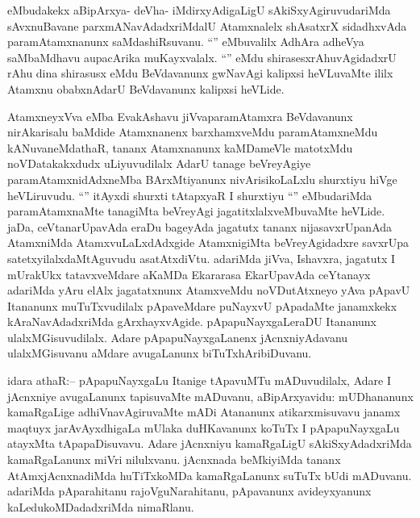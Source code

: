 \begin{artha}
eMbudakekx aBipArxya- deVha- iMdirxyAdigaLigU sAkiSxyAgiruvudariMda sAvxnuBavane parxmANavAdadxriMdalU Atamxnalelx shAsatxrX sidadhxvAda paramAtamxnanunx saMdashiRsuvanu. ``\stext'' eMbuvalilx AdhAra adheVya saMbaMdhavu aupacArika muKayxvalalx. ``\stext'' eMdu shirasesxrAhuvAgidadxrU rAhu dina shirasusx eMdu BeVdavanunx gwNavAgi kalipxsi heVLuvaMte ililx Atamxnu obabxnAdarU BeVdavanunx kalipxsi heVLide.
\end{artha}

\begin{artha}
AtamxneyxVva eMba EvakAshavu jiVvaparamAtamxra BeVdavanunx nirAkarisalu baMdide Atamxnanenx barxhamxveMdu paramAtamxneMdu kANuvaneMdathaR, tananx Atamxnanunx kaMDameVle matotxMdu noVDatakakxdudx uLiyuvudilalx AdarU tanage beVreyAgiye paramAtamxnidAdxneMba BArxMtiyanunx nivArisikoLaLxlu shurxtiyu hiVge heVLiruvudu. ``\stext'' itAyxdi shurxti tAtapxyaR I shurxtiyu ``\stext'' eMbudariMda paramAtamxnaMte tanagiMta beVreyAgi jagatitxlalxveMbuvaMte heVLide. jaDa, ceVtanarUpavAda eraDu bageyAda jagatutx tananx nijasavxrUpanAda AtamxniMda AtamxvuLaLxdAdxgide AtamxnigiMta beVreyAgidadxre savxrUpa satetxyilalxdaMtAguvudu asatAtxdiVtu. adariMda jiVva, Ishavxra, jagatutx I mUrakUkx tatavxveMdare aKaMDa Ekararasa EkarUpavAda ceYtanayx adariMda yAru elAlx jagatatxnunx AtamxveMdu noVDutAtxneyo yAva pApavU Itananunx muTuTxvudilalx pApaveMdare puNayxvU pApadaMte janamxkekx kAraNavAdadxriMda gArxhayxvAgide. pApapuNayxgaLeraDU Itananunx ulalxMGisuvudilalx. Adare pApapuNayxgaLanenx jAcnxniyAdavanu ulalxMGisuvanu aMdare avugaLanunx biTuTxhAribiDuvanu. 
\end{artha}

\begin{artha}
idara athaR:-- pApapuNayxgaLu Itanige tApavuMTu mADuvudilalx, Adare I jAcnxniye avugaLanunx tapisuvaMte mADuvanu, aBipArxyavidu: mUDhananunx kamaRgaLige adhiVnavAgiruvaMte mADi Atananunx atikarxmisuvavu janamx maqtuyx jarAvAyxdhigaLa mUlaka duHKavanunx koTuTx I pApapuNayxgaLu atayxMta tApapaDisuvavu. Adare jAcnxniyu kamaRgaLigU sAkiSxyAdadxriMda kamaRgaLanunx miVri nilulxvanu. jAcnxnada beMkiyiMda tananx AtAmxjAcnxnadiMda huTiTxkoMDa kamaRgaLanunx suTuTx bUdi mADuvanu. adariMda pAparahitanu rajoVguNarahitanu, pApavanunx avideyxyanunx kaLedukoMDadadxriMda nimaRlanu.
\end{artha}

